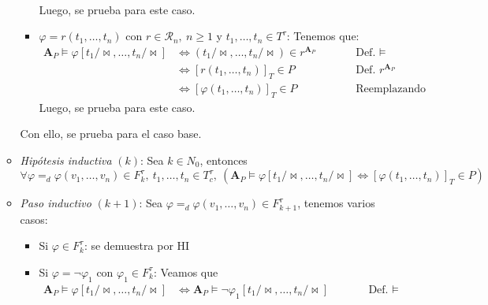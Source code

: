 \documentclass{article}
\begin{document}
\begin{enumerate}
\begin{itemize}
\begin{itemize}
\begin{equation*}
\begin{alignedat}{2}
                          \end{alignedat}
                        \end{equation*}
                        Luego, se prueba para este caso.
                  \item $\varphi=r(t_1,\dots,t_n)$ con $r\in\mathcal{R}_n,\ n\geq 1$ y $t_1,\dots,t_n\in T^\tau$: Tenemos que:
                        \begin{equation*}
                          \begin{alignedat}{2}
                            \mathbf{A}_P\vDash\varphi[t_1/\!\bowtie,\dots,t_n/\!\bowtie] & \iff (t_1/\!\bowtie,\dots,t_n/\!\bowtie)\in r^{\mathbf{A}_P} &  & \qquad\text{Def. }\vDash           \\
                                                                                         & \iff [r(t_1,\dots,t_n)]_T\in P                               &  & \qquad\text{Def. }r^{\mathbf{A}_P} \\
                                                                                         & \iff [\varphi(t_1,\dots,t_n)]_T\in P                         &  & \qquad\text{Reemplazando}
                          \end{alignedat}
                        \end{equation*}
                        Luego, se prueba para este caso.
                \end{itemize}
                Con ello, se prueba para el caso base.
          \item \textit{Hipótesis inductiva} $(k)$: Sea $k\in N_0$, entonces $\forall\varphi=_d\varphi(v_1,\dots,v_n)\in F^\tau_k,\ t_1,\dots,t_n\in T^\tau_c,\ (\mathbf{A}_P\vDash\varphi[t_1/\!\bowtie,\dots,t_n/\!\bowtie]\iff[\varphi(t_1,\dots,t_n)]_T\in P)$
          \item \textit{Paso inductivo} $(k+1)$: Sea $\varphi=_d\varphi(v_1,\dots,v_n)\in F^\tau_{k+1}$, tenemos varios casos:
                \begin{itemize}
                  \item Si $\varphi\in F^\tau_k$: se demuestra por HI
                  \item Si $\varphi=\neg\varphi_1$ con $\varphi_1\in F^\tau_k$: Veamos que
                        \begin{equation*}
                          \begin{alignedat}{2}
                            \mathbf{A}_P\vDash\varphi[t_1/\!\bowtie,\dots,t_n/\!\bowtie] & \iff\mathbf{A}_P\vDash\neg\varphi_1[t_1/\!\bowtie,\dots,t_n/\!\bowtie] &  & \qquad\text{Def. }\vDash           \\

\end{alignedat}
\end{equation*}
\end{itemize}
\end{itemize}
\end{enumerate}
\end{document}
